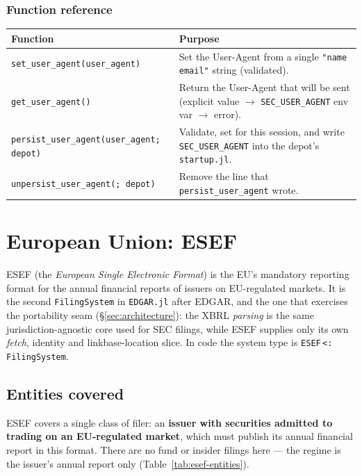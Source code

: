 \documentclass[11pt,a4paper]{report}
\begin{document}
\begin{subappendices}
\subsection{Function reference}
\begin{longtable}{@{}p{}p{}@{}}
\toprule
\textbf{Function} & \textbf{Purpose} \\
\midrule
\endhead
\texttt{set\_user\_agent(user\_agent)} & Set the User-Agent from a single \texttt{"name email"} string
  (validated). \\
\texttt{get\_user\_agent()} & Return the User-Agent that will be sent (explicit value $\to$
  \texttt{SEC\_USER\_AGENT} env var $\to$ error). \\
\texttt{persist\_user\_agent(user\_agent; depot)} & Validate, set for this session, and write
  \texttt{SEC\_USER\_AGENT} into the depot's \texttt{startup.jl}. \\
\texttt{unpersist\_user\_agent(; depot)} & Remove the line that \texttt{persist\_user\_agent} wrote. \\
\bottomrule
\end{longtable}
\end{subappendices}

\chapter{European Union: ESEF}
\label{sys:esef}

ESEF (the \emph{European Single Electronic Format}) is the EU's mandatory reporting format for the
annual financial reports of issuers on EU-regulated markets. It is the second \texttt{FilingSystem}
in \texttt{EDGAR.jl} after EDGAR, and the one that exercises the portability seam
(\S\ref{sec:architecture}): the XBRL \emph{parsing} is the same jurisdiction-agnostic core used for
SEC filings, while ESEF supplies only its own \emph{fetch}, identity and linkbase-location slice. In
code the system type is \texttt{ESEF}\,\texttt{<:}\,\texttt{FilingSystem}.

\section{Entities covered}\label{sec:esef-entities}

ESEF covers a single class of filer: an \textbf{issuer with securities admitted to trading on an
EU-regulated market}, which must publish its annual financial report in this format. There are no fund or
insider filings here --- the regime is the issuer's annual report only (Table~\ref{tab:esef-entities}).
\end{document}
